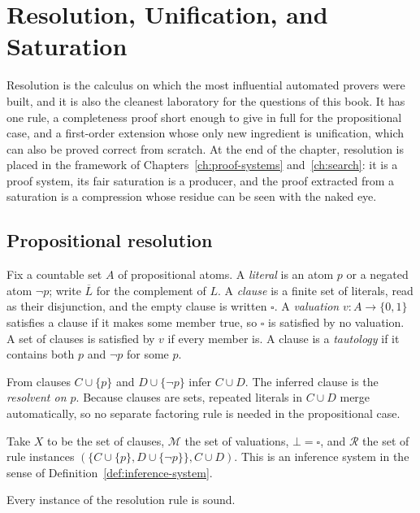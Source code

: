 \chapter{Resolution, Unification, and Saturation}
\label{ch:resolution}

Resolution is the calculus on which the most influential automated provers were built, and it is also the cleanest laboratory for the questions of this book. It has one rule, a completeness proof short enough to give in full for the propositional case, and a first-order extension whose only new ingredient is unification, which can also be proved correct from scratch. At the end of the chapter, resolution is placed in the framework of Chapters~\ref{ch:proof-systems} and~\ref{ch:search}: it is a proof system, its fair saturation is a producer, and the proof extracted from a saturation is a compression whose residue can be seen with the naked eye.

\section{Propositional resolution}
\label{sec:prop-res}

Fix a countable set $A$ of propositional atoms. A \emph{literal} is an atom $p$ or a negated atom $\neg p$; write $\overline{L}$ for the complement of $L$. A \emph{clause} is a finite set of literals, read as their disjunction, and the empty clause is written $\square$. A \emph{valuation} $v:A\to\{0,1\}$ satisfies a clause if it makes some member true, so $\square$ is satisfied by no valuation. A set of clauses is satisfied by $v$ if every member is. A clause is a \emph{tautology} if it contains both $p$ and $\neg p$ for some $p$.

\begin{definition}
\label{def:prop-res}
From clauses $C\cup\{p\}$ and $D\cup\{\neg p\}$ infer $C\cup D$. The inferred clause is the \emph{resolvent on $p$}. Because clauses are sets, repeated literals in $C\cup D$ merge automatically, so no separate factoring rule is needed in the propositional case.
\end{definition}

Take $X$ to be the set of clauses, $\mathcal{M}$ the set of valuations, $\bot=\square$, and $\mathcal{R}$ the set of rule instances $(\{C\cup\{p\},D\cup\{\neg p\}\},C\cup D)$. This is an inference system in the sense of Definition~\ref{def:inference-system}.

\begin{proposition}[Soundness]
\label{prop:prop-res-sound}
Every instance of the resolution rule is sound.
\end{proposition}

